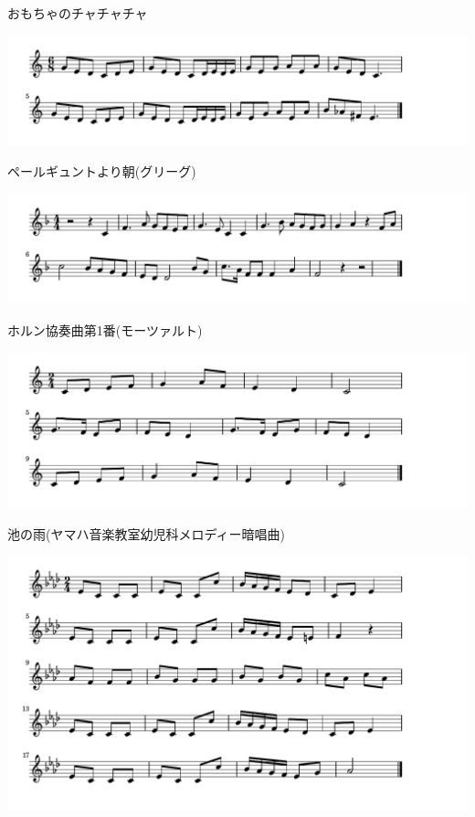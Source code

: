 \documentclass[a4paper]{ltjsarticle}
\begin{document}
\vspace{-10mm} \hspace{10mm}
おもちゃのチャチャチャ

\includegraphics[clip]{peergyntasagrieg_crop.pdf}

\vspace{-10mm} \hspace{10mm}
ペールギュントより朝(グリーグ)

\includegraphics[clip]{hornmozart_crop.pdf}

\vspace{-10mm} \hspace{10mm}
ホルン協奏曲第1番(モーツァルト)

\includegraphics[clip]{ikenoame_crop.pdf}

\vspace{-10mm} \hspace{10mm}
池の雨(ヤマハ音楽教室幼児科メロディー暗唱曲)

\includegraphics[clip]{turkbeethoven_crop.pdf}
\end{document}
